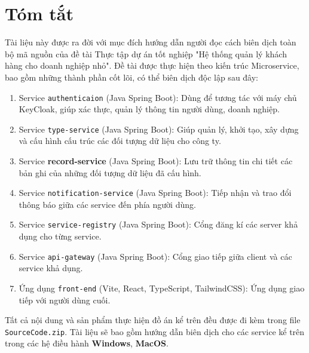 \chapter*{Tóm tắt}
\label{summary}
Tài liệu này được ra đời với mục đích hướng dẫn người đọc cách biên dịch toàn bộ mã nguồn của đề tài Thực tập dự án tốt nghiệp "Hệ thống quản lý khách hàng cho doanh nghiệp nhỏ".
Đề tài được thực hiện theo kiến trúc Microservice, bao gồm những thành phần cốt lõi, có thể biên dịch độc lập sau đây:
\begin{enumerate}
    \item Service \texttt{authenticaion} (Java Spring Boot): Dùng để tương tác với máy chủ KeyCloak, giúp xác thực, quản lý thông tin người dùng, doanh nghiệp.
    \item Service \texttt{type-service} (Java Spring Boot): Giúp quản lý, khởi tạo, xây dựng và cấu hình cấu trúc các đối tượng dữ liệu cho công ty.
    \item Service \textbf{record-service} (Java Spring Boot): Lưu trữ thông tin chi tiết các bản ghi của những đối tượng dữ liệu đã cấu hình.
    \item Service \texttt{notification-service} (Java Spring Boot): Tiếp nhận và trao đổi thông báo giữa các service đến phía người dùng.
    \item Service \texttt{service-registry} (Java Spring Boot): Cổng đăng kí các server khả dụng cho từng service.
    \item Service \texttt{api-gateway} (Java Spring Boot): Cổng giao tiếp giữa client và các service khả dụng.
    \item Ứng dụng \texttt{front-end} (Vite, React, TypeScript, TailwindCSS): Ứng dụng giao tiếp với người dùng cuối.
\end{enumerate}

Tất cả nội dung và sản phẩm thực hiện đồ án kể trên đều được đi kèm trong file \texttt{SourceCode.zip}. Tài liệu sẽ bao gồm hướng dẫn biên dịch cho các service kể trên trong các hệ điều hành \textbf{Windows}, \textbf{MacOS}.